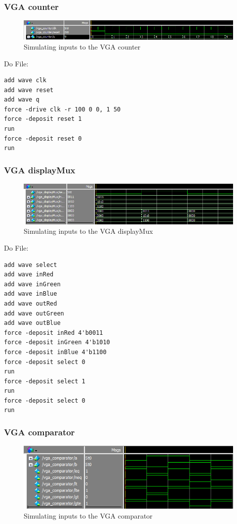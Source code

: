 \documentclass[a4paper]{article}
\begin{document}
\subsubsection{VGA counter}

\begin{figure}[H]
    \includegraphics[width=0.8 \linewidth]{images/vgaCounterSim.png}
    \caption{Simulating inputs to the VGA counter}
    \label{vgaCounterSim}
\end{figure}

Do File:

\begin{Verbatim}
add wave clk
add wave reset
add wave q
force -drive clk -r 100 0 0, 1 50
force -deposit reset 1
run
force -deposit reset 0
run
\end{Verbatim}

\subsubsection{VGA displayMux}

\begin{figure}[H]
    \includegraphics[width=0.8 \linewidth]{images/vgaDisplayMuxSim.png}
    \caption{Simulating inputs to the VGA displayMux}
    \label{vgaDisplayMuxSim}
\end{figure}

Do File:

\begin{Verbatim}
add wave select
add wave inRed
add wave inGreen
add wave inBlue
add wave outRed
add wave outGreen
add wave outBlue
force -deposit inRed 4'b0011
force -deposit inGreen 4'b1010
force -deposit inBlue 4'b1100
force -deposit select 0
run
force -deposit select 1
run
force -deposit select 0
run
\end{Verbatim}

\subsubsection{VGA comparator}

\begin{figure}[H]
    \includegraphics[width=0.8 \linewidth]{images/vgaCompSim.png}
    \caption{Simulating inputs to the VGA comparator}
    \label{vgaCompSim}
\end{figure}
\end{document}
